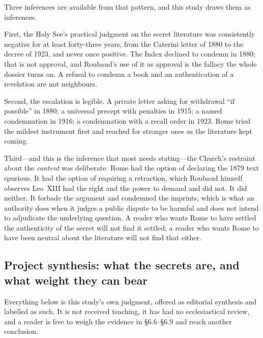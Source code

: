 Three inferences are available from that pattern, and this study
draws them as inferences.

First, the Holy See's practical judgment on the secret literature
was consistently negative for at least forty-three years, from the
Caterini letter of 1880 to the decree of 1923, and never once
positive. The Index declined to condemn in 1880; that is not
approval, and Roubaud's use of it as approval is the fallacy the
whole dossier turns on. A refusal to condemn a book and an
authentication of a revelation are not neighbours.

Second, the escalation is legible. A private letter asking for
withdrawal ``if possible'' in 1880; a universal precept with
penalties in 1915; a named condemnation in 1916; a condemnation with
a recall order in 1923. Rome tried the mildest instrument first and
reached for stronger ones as the literature kept coming.

Third---and this is the inference that most needs stating---the
Church's restraint about the \emph{content} was deliberate. Rome had
the option of declaring the 1879 text spurious. It had the option of
requiring a retraction, which Roubaud himself observes Leo~XIII had
the right and the power to demand and did not. It did neither. It
forbade the argument and condemned the imprints, which is what an
authority does when it judges a public dispute to be harmful and
does not intend to adjudicate the underlying question. A reader who
wants Rome to have settled the authenticity of the secret will not
find it settled; a reader who wants Rome to have been neutral about
the literature will not find that either.

\subsection{Project synthesis: what the secrets are, and what weight
they can bear}

Everything below is this study's own judgment, offered as editorial
synthesis and labelled as such. It is not received teaching, it has
had no ecclesiastical review, and a reader is free to weigh the
evidence in \S6.6--\S6.9 and reach another conclusion.


